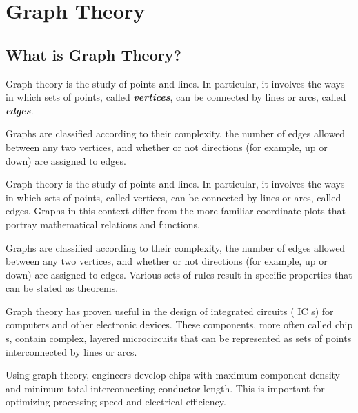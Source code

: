 \documentclass[a4paper,12pt]{article}
\begin{document}
\section*{Graph Theory}
\subsection*{What is Graph Theory?}

Graph theory is the study of points and lines. In particular, it involves the ways in which sets of points, called \textit{\textbf{vertices}}, can be connected by lines or arcs, called \textit{\textbf{edges}}.

Graphs are classified according to their complexity, the number of edges allowed between any two vertices, and whether or not directions (for example, up or down) are assigned to edges. 

Graph theory is the study of points and lines. In particular, it involves the ways in which sets of points, called vertices, can be connected by lines or arcs, called edges. Graphs in this context differ from the more familiar coordinate plots that portray mathematical relations and functions.

Graphs are classified according to their complexity, the number of edges allowed between any two vertices, and whether or not directions (for example, up or down) are assigned to edges. Various sets of rules result in specific properties that can be stated as theorems.

Graph theory has proven useful in the design of integrated circuits ( IC s) for computers and other electronic devices. These components, more often called chip s, contain complex, layered microcircuits that can be represented as sets of points interconnected by lines or arcs. 

Using graph theory, engineers develop chips with maximum component density and minimum total interconnecting conductor length. This is important for optimizing processing speed and electrical efficiency.
\end{document}

